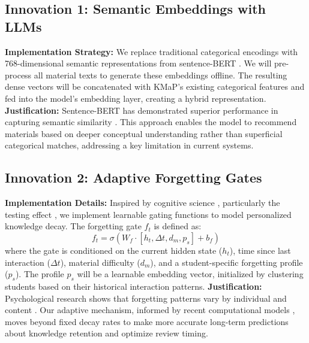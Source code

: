 \documentclass[project-plan]{report-template}
\begin{document}
\subsection{Innovation 1: Semantic Embeddings with LLMs}
\textbf{Implementation Strategy:} We replace traditional categorical encodings with 768-dimensional semantic representations from sentence-BERT \cite{reimers2019sentence}. We will pre-process all material texts to generate these embeddings offline. The resulting dense vectors will be concatenated with KMaP's existing categorical features and fed into the model's embedding layer, creating a hybrid representation.
\textbf{Justification:} Sentence-BERT has demonstrated superior performance in capturing semantic similarity \cite{reimers2019sentence}. This approach enables the model to recommend materials based on deeper conceptual understanding rather than superficial categorical matches, addressing a key limitation in current systems.

\subsection{Innovation 2: Adaptive Forgetting Gates}
\textbf{Implementation Details:} Inspired by cognitive science \cite{ebbinghaus1885memory,wixted2004psychology}, particularly the testing effect \cite{karpicke2008critical}, we implement learnable gating functions to model personalized knowledge decay. The forgetting gate $f_t$ is defined as:
\begin{equation}
    f_t = \sigma(W_f \cdot [h_t, \Delta t, d_m, p_s] + b_f)
\end{equation}
where the gate is conditioned on the current hidden state ($h_t$), time since last interaction ($\Delta t$), material difficulty ($d_m$), and a student-specific forgetting profile ($p_s$). The profile $p_s$ will be a learnable embedding vector, initialized by clustering students based on their historical interaction patterns.
\textbf{Justification:} Psychological research shows that forgetting patterns vary by individual and content \cite{wixted2004psychology,murre2015replication}. Our adaptive mechanism, informed by recent computational models \cite{sha2024forgetting,wang2024personalized}, moves beyond fixed decay rates to make more accurate long-term predictions about knowledge retention and optimize review timing.
\end{document}
